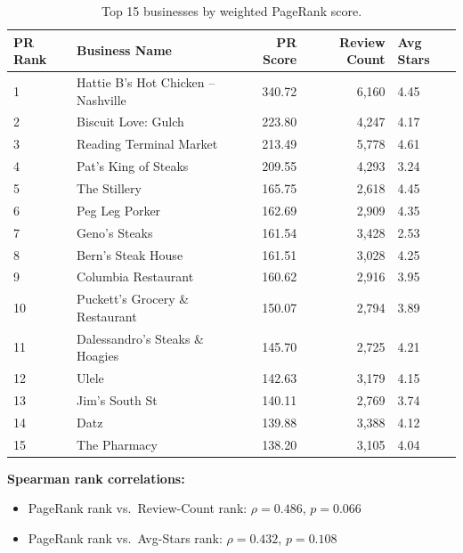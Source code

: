 \documentclass[11pt,a4paper]{article}
\begin{document}
\begin{table}[H]
\centering\small
\caption{Top 15 businesses by weighted PageRank score.}
\begin{tabularx}{\textwidth}{lXrrl}
\toprule
\textbf{PR Rank} & \textbf{Business Name} & \textbf{PR Score} & \textbf{Review Count} & \textbf{Avg Stars}\\
\midrule
1  & Hattie B's Hot Chicken -- Nashville    & 340.72 & 6{,}160 & 4.45\\
2  & Biscuit Love: Gulch                    & 223.80 & 4{,}247 & 4.17\\
3  & Reading Terminal Market                & 213.49 & 5{,}778 & 4.61\\
4  & Pat's King of Steaks                   & 209.55 & 4{,}293 & 3.24\\
5  & The Stillery                           & 165.75 & 2{,}618 & 4.45\\
6  & Peg Leg Porker                         & 162.69 & 2{,}909 & 4.35\\
7  & Geno's Steaks                          & 161.54 & 3{,}428 & 2.53\\
8  & Bern's Steak House                     & 161.51 & 3{,}028 & 4.25\\
9  & Columbia Restaurant                    & 160.62 & 2{,}916 & 3.95\\
10 & Puckett's Grocery \& Restaurant        & 150.07 & 2{,}794 & 3.89\\
11 & Dalessandro's Steaks \& Hoagies        & 145.70 & 2{,}725 & 4.21\\
12 & Ulele                                  & 142.63 & 3{,}179 & 4.15\\
13 & Jim's South St                         & 140.11 & 2{,}769 & 3.74\\
14 & Datz                                   & 139.88 & 3{,}388 & 4.12\\
15 & The Pharmacy                           & 138.20 & 3{,}105 & 4.04\\
\bottomrule
\end{tabularx}
\end{table}

\textbf{Spearman rank correlations:}
\begin{itemize}
  \item PageRank rank vs.\ Review-Count rank: $\rho = 0.486$, $p = 0.066$
  \item PageRank rank vs.\ Avg-Stars rank: $\rho = 0.432$, $p = 0.108$
\end{itemize}
\end{document}
